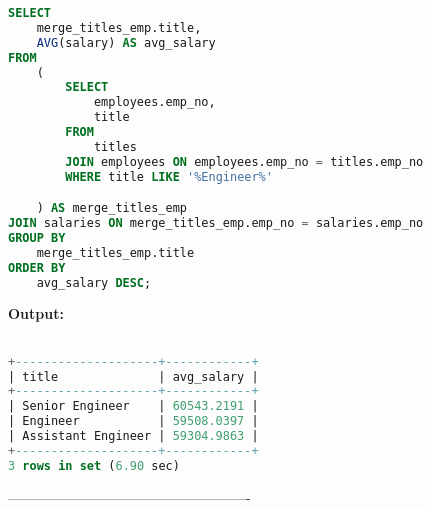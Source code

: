 \documentclass[12pt]{report}
\begin{document}
\begin{lstlisting}[language=sql]
SELECT
	merge_titles_emp.title,
	AVG(salary) AS avg_salary
FROM
	(
		SELECT
			employees.emp_no,
			title
		FROM
			titles
		JOIN employees ON employees.emp_no = titles.emp_no 
		WHERE title LIKE '%Engineer%'

	) AS merge_titles_emp
JOIN salaries ON merge_titles_emp.emp_no = salaries.emp_no
GROUP BY
	merge_titles_emp.title
ORDER BY
	avg_salary DESC;
\end{lstlisting}


\textbf{Output:}

\begin{lstlisting}[language=sql]

+--------------------+------------+
| title              | avg_salary |
+--------------------+------------+
| Senior Engineer    | 60543.2191 |
| Engineer           | 59508.0397 |
| Assistant Engineer | 59304.9863 |
+--------------------+------------+
3 rows in set (6.90 sec)


\end{lstlisting}
----------------------------------------------------
\end{document}
